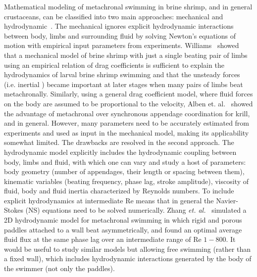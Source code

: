 \documentclass[%
 onecolumn,
superscriptaddress,
 amsmath,amssymb,
 aps,
longbibliography
]{revtex4-2}
\begin{document}
Mathematical modeling of metachronal swimming in brine shrimp, and in  general crustaceans, can be classified into two main approaches: mechanical and hydrodynamic~\cite{Byron2021MetachronalMotion}. The mechanical ignores explicit hydrodynamic interactions between body, limbs and surrounding fluid by solving Newton's equations of motion with empirical input parameters from experiments. Williams~\cite{Williams1994AModel} showed that a mechanical model of brine shrimp with just a single beating pair of limbs using an empirical relation of drag coefficients is sufficient to explain the hydrodynamics of larval brine shrimp swimming and that the unsteady forces (i.e. inertial ) became important at later stages when many pairs of limbs beat metachronally. Similarly, using a general drag coefficient model, where fluid forces on the body are assumed to be proportional to the velocity, Alben et. al.~\cite{Alben2010Coordination} showed the advantage of metachronal over synchronous appendage coordination for krill, and in general. However, many parameters need to be accurately estimated from experiments and used as input in the mechanical model, making its applicability somewhat limited. The drawbacks are resolved in the second approach. The hydrodynamic model explicitly includes the hydrodynamic coupling between body, limbs and fluid, with which one can vary and study a host of parameters: body geometry (number of appendages, their length or spacing between them), kinematic variables (beating frequency, phase lag, stroke amplitude), viscosity of fluid, body and fluid inertia characterized by Reynolds numbers. To include explicit hydrodynamics at intermediate Re means that in general the Navier-Stokes (NS) equations need to be solved numerically. Zhang \textit{et. al.}~\cite{Zhang2014Neural, Granzier-nakajima2020ANumerical} simulated a 2D hydrodynamic model for metachronal swimming in which rigid and porous paddles attached to a wall beat asymmetrically, and found an optimal average fluid flux at the same phase lag over an intermediate range of Re $1-800$. It would be useful to study similar models but allowing free swimming (rather than a fixed wall), which includes hydrodynamic interactions generated by the body of the swimmer (not only the paddles). 
\end{document}
